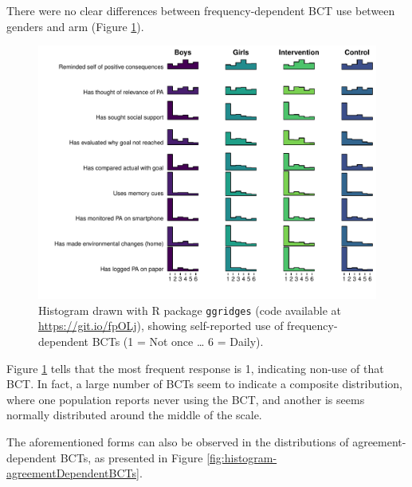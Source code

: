 \documentclass[english,man,floatsintext]{apa6}
\begin{document}
There were no clear differences between frequency-dependent BCT use between genders and arm (Figure \ref{fig:histogram-frequencyDependentBCTs}).

\begin{figure}
\centering
\includegraphics{_baseline-manuscript_files/figure-latex/histogram-frequencyDependentBCTs-1.pdf}
\caption{\label{fig:histogram-frequencyDependentBCTs}Histogram drawn with R package \texttt{ggridges} (code available at \url{https://git.io/fpOLj}), showing self-reported use of frequency-dependent BCTs (1 = Not once \ldots{} 6 = Daily).}
\end{figure}

Figure \ref{fig:histogram-frequencyDependentBCTs} tells that the most frequent response is 1, indicating non-use of that BCT. In fact, a large number of BCTs seem to indicate a composite distribution, where one population reports never using the BCT, and another is seems normally distributed around the middle of the scale.

The aforementioned forms can also be observed in the distributions of agreement-dependent BCTs, as presented in Figure \ref{fig:histogram-agreementDependentBCTs}.
\end{document}
